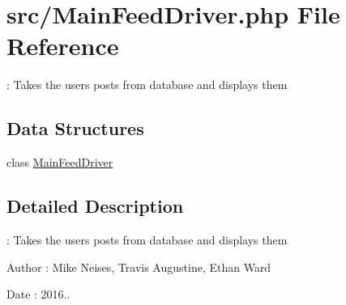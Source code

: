\hypertarget{_main_feed_driver_8php}{}\section{src/\+Main\+Feed\+Driver.php File Reference}
\label{_main_feed_driver_8php}


\+: Takes the user\textquotesingle{}s posts from database and displays them  


\subsection*{Data Structures}
\begin{DoxyCompactItemize}
\item 
class \hyperlink{class_main_feed_driver}{Main\+Feed\+Driver}
\end{DoxyCompactItemize}


\subsection{Detailed Description}
\+: Takes the user\textquotesingle{}s posts from database and displays them 

\begin{DoxyAuthor}{Author}
\+: Mike Neises, Travis Augustine, Ethan Ward 
\end{DoxyAuthor}
\begin{DoxyDate}{Date}
\+: 2016.. 
\end{DoxyDate}

